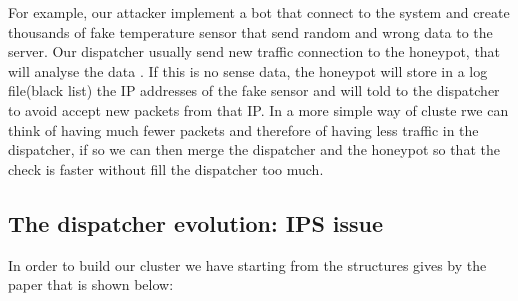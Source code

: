  For example, our attacker implement a bot that connect to the system and create thousands of fake temperature sensor that send random and wrong data to the server. Our dispatcher usually send new traffic connection to the honeypot, that will analyse the data . If this is no sense data, the honeypot will store in a log file(black list) the IP addresses of the fake sensor and will told to the dispatcher  to avoid accept new packets from that IP.
In a more simple way of cluste rwe can think of having much fewer packets and therefore of having less traffic in the dispatcher, if so we can then merge the dispatcher and the honeypot so that the check is faster without fill the dispatcher too much.

\subsection{The dispatcher evolution: IPS issue}

In order to build our cluster we have starting from the structures gives by the paper that is shown below:\\

